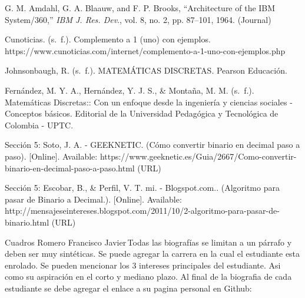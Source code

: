 \documentclass{IEEEcsmag}
\begin{document}
\begin{thebibliography}{1}

G. M. Amdahl, G. A. Blaauw, and F. P. Brooks, ``Architecture of the IBM System/360,'' {\it IBM J. Res. Dev}., vol. 8, no. 2, pp. 87--101, 1964. (Journal)

Cunoticias. (s. f.). Complemento a 1 (uno) con ejemplos. https://www.cunoticias.com/internet/complemento-a-1-uno-con-ejemplos.php

Johnsonbaugh, R. (s. f.). MATEMÁTICAS DISCRETAS. Pearson Educación.

Fernández, M. Y. A., Hernández, Y. J. S., & Montaña, M. M. (s. f.). Matemáticas Discretas:: Con un enfoque desde la ingeniería y ciencias sociales - Conceptos básicos. Editorial de la Universidad Pedagógica y Tecnológica de Colombia - UPTC.

Sección 5: Soto, J. A. - GEEKNETIC. (Cómo convertir binario en decimal paso a paso). [Online]. Available: {https://www.geeknetic.es/Guia/2667/Como-convertir-binario-en-decimal-paso-a-paso.html} (URL)

Sección 5: Escobar, B., & Perfil, V. T. mi. - Blogspot.com.. (Algoritmo para pasar de Binario a Decimal.). [Online]. Available: {http://mensajeseintereses.blogspot.com/2011/10/2-algoritmo-para-pasar-de-binario.html} (URL)

\end{thebibliography}\vspace*{-8pt}


\begin{IEEEbiography}{Cuadros Romero Francisco Javier}{\,}Todas las biografías se limitan a un párrafo y deben ser muy sintéticas. Se puede agregar la carrera en la cual el estudiante esta enrolado. Se pueden mencionar los 3 intereses principales del estudiante. Asi como su aspiración en el corto y mediano plazo. Al final de la biografia de cada estudiante se debe agregar el enlace a su pagina personal en Github: 
\end{IEEEbiography}
\end{document}
